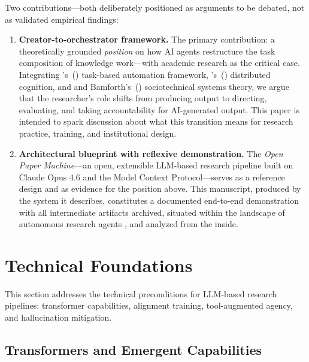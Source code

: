 \documentclass{article}
\begin{document}
Two contributions---both deliberately positioned as arguments to be debated, not as validated empirical findings:

\begin{enumerate}
  \item \textbf{Creator-to-orchestrator framework.} The primary contribution: a theoretically grounded \textit{position} on how AI agents restructure the task composition of knowledge work---with academic research as the critical case. Integrating \citeauthor{autor2015why}'s~(\citeyear{autor2015why}) task-based automation framework, \citeauthor{hutchins1995cognition}'s~(\citeyear{hutchins1995cognition}) distributed cognition, and \citeauthor{trist1951social} and Bamforth's~(\citeyear{trist1951social}) sociotechnical systems theory, we argue that the researcher's role shifts from producing output to directing, evaluating, and taking accountability for AI-generated output. This paper is intended to spark discussion about what this transition means for research practice, training, and institutional design.
  \item \textbf{Architectural blueprint with reflexive demonstration.} The \textit{Open Paper Machine}---an open, extensible LLM-based research pipeline built on Claude Opus 4.6 and the Model Context Protocol---serves as a reference design and as evidence for the position above. This manuscript, produced by the system it describes, constitutes a documented end-to-end demonstration with all intermediate artifacts archived, situated within the landscape of autonomous research agents \citep{handler2023taxonomy,wang2024survey}, and analyzed from the inside.
\end{enumerate}


\section{Technical Foundations}
\label{sec:tech}

This section addresses the technical preconditions for LLM-based research pipelines: transformer capabilities, alignment training, tool-augmented agency, and hallucination mitigation.

\subsection{Transformers and Emergent Capabilities}
\end{document}
